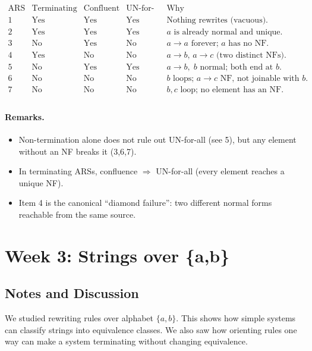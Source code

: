 \documentclass{article}
\theoremstyle{theorem}
\theoremstyle{definition}
\theoremstyle{remark}
\begin{document}
\[
\begin{array}{c|c|c|c|l}
\text{ARS} & \text{Terminating} & \text{Confluent} & \text{UN-for-all} & \text{Why} \\\hline
1 & \text{Yes} & \text{Yes} & \text{Yes} & \text{Nothing rewrites (vacuous).} \\
2 & \text{Yes} & \text{Yes} & \text{Yes} & a \text{ is already normal and unique.} \\
3 & \text{No} & \text{Yes} & \text{No}  & a \to a \text{ forever; } a \text{ has no NF.} \\
4 & \text{Yes} & \text{No}  & \text{No}  & a\to b,\,a\to c \text{ (two distinct NFs).} \\
5 & \text{No} & \text{Yes} & \text{Yes} & a\to b,\; b \text{ normal; both end at } b. \\
6 & \text{No} & \text{No}  & \text{No}  & b \text{ loops; } a\to c \text{ NF, not joinable with } b. \\
7 & \text{No} & \text{No}  & \text{No}  & b,c \text{ loop; no element has an NF.} \\
\end{array}
\]

\paragraph{Remarks.}
\begin{itemize}
  \item Non-termination alone does not rule out UN-for-all (see 5), but any element without an NF breaks it (3,6,7).
  \item In terminating ARSs, confluence $\Rightarrow$ UN-for-all (every element reaches a unique NF).
  \item Item 4 is the canonical “diamond failure”: two different normal forms reachable from the same source.
\end{itemize}

\section{Week 3: Strings over \{a,b\}}

\subsection{Notes and Discussion}
We studied rewriting rules over alphabet $\{a,b\}$. 
This shows how simple systems can classify strings into equivalence classes. 
We also saw how orienting rules one way can make a system terminating without changing equivalence.
\end{document}
